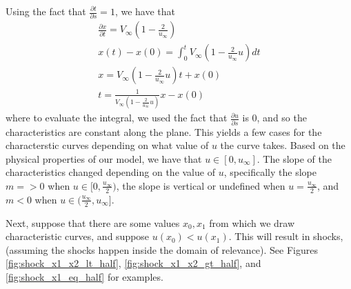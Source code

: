 \documentclass[12pt]{article}
\begin{document}
    Using the fact that $\frac{\partial t}{\partial s} = 1$, we have that 
    \begin{align*}
        \frac{\partial x }{\partial t} = V_\infty (1 - \frac{2}{u_\infty} ) \\
        x(t) - x(0) = \int_{0}^{t} V_\infty(1 - \frac{2}{u_\infty} u) dt \\
        x = V_\infty(1 - \frac{2}{u_\infty} u) t + x(0) \\
        t = \frac{1}{  V_\infty(1 - \frac{2}{u_\infty} u) }x - x(0)
    \end{align*}
    where to evaluate the integral, we used the fact that $\frac{\partial u}{\partial s}$ is $0$, and so the characteristics are constant along the plane. This yields a few cases for the characterstic curves depending on what value of $u$ the curve takes. Based on the physical properties of our model, we have that $u \in [0, u_\infty]$. The slope of the characteristics changed depending on the value of $u$, specifically the slope $m = > 0$ when $u \in [0, \frac{u_\infty}{2}) $, the slope is vertical or undefined when $u = \frac{u_\infty}{2}$, and $m < 0$ when $u \in ( \frac{u_\infty}{2}, u_\infty]$.
    
    Next, suppose that there are some values $x_0, x_1$ from which we draw characteristic curves, and suppose $u(x_0) < u(x_1)$. This will result in shocks, (assuming the shocks happen inside the domain of relevance). See Figures \ref{fig:shock_x1_x2_lt_half}, \ref{fig:shock_x1_x2_gt_half}, and \ref{fig:shock_x1_eq_half} for examples. 
    
\end{document}
